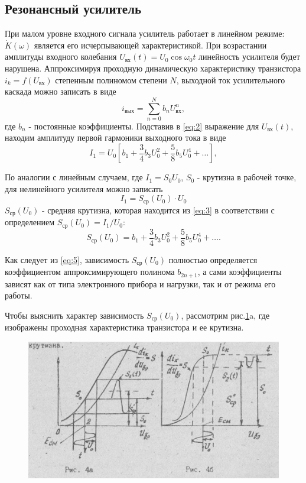 \subsection{Резонансный усилитель}
При малом уровне входного сигнала усилитель работает в линейном режиме: $\dot{K}(\omega)$ является его исчерпывающей характеристикой.
При возрастании амплитуды входного колебания $U_\text{вх}(t)=U_0\cos \omega_0 t$ линейность усилителя будет нарушена. Аппроксимируя проходную динамическую характеристику транзистора $i_k=f(U_\text{вх})$ степенным полиномом степени $N$, выходной ток усилительного каскада можно записать в виде
\begin{equation}
i_\text{вых}=\sum\limits_{n=0}^{N}b_n U^n_\text{вх},
\label{eq:2}
\end{equation}
где $b_n$ - постоянные коэффициенты.
Подставив в \eqref{eq:2} выражение для $U_\text{вх}(t)$, находим амплитуду первой гармоники выходного тока в виде
\begin{equation}
I_1=U_0[b_1+\frac{3}{4}b_3U_0^2+\frac{5}{8}b_5U_0^4+\ldots],
\label{eq:3}
\end{equation}

По аналогии с линейным случаем, где $I_1=S_0U_0$, $S_0$ - крутизна в рабочей точке, для нелинейного усилителя можно записать 
\begin{equation}
I_1=S_\text{ср}(U_0)\cdot U_0
\label{eq:4}
\end{equation}
$S_\text{ср}(U_0)$ - средняя крутизна, которая находится из \eqref{eq:3} в соответствии с определением $S_\text{ср}(U_0)=I_1/U_0$:
\begin{equation}
S_\text{ср}(U_0)=b_1+\frac{3}{4}b_3U_0^2+\frac{5}{8}b_5U_0^4+\ldots.
\label{eq:5}
\end{equation}

Как следует из \eqref{eq:5}, зависимость $S_\text{ср}(U_0)$ полностью определяется коэффициентом аппроксимирующего полинома $b_{2n+1}$, а сами коэффициенты зависят как от типа электронного прибора и нагрузки, так и от режима его работы.

Чтобы выяснить характер зависимость $S_\text{ср}(U_0)$, рассмотрим рис.\ref{fig:fig4}a, где изображены проходная характеристика транзистора и ее крутизна.
\begin{figure}[h]
	\centering
	\includegraphics[width=0.4\linewidth]{circuit/4.jpg}
	\caption{}
	\label{fig:fig4}
\end{figure}

